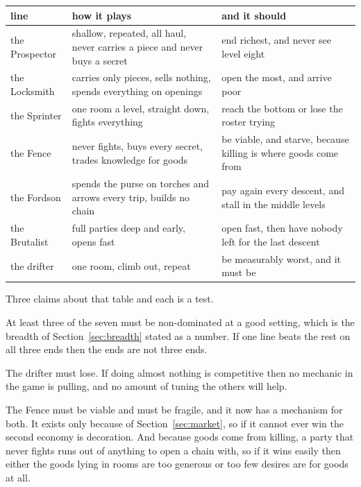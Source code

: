 \documentclass[11pt,a4paper]{article}
\begin{document}
\begin{center}
\begin{tabular}{@{}l@{\hspace{4mm}}>{\raggedright\arraybackslash}p{}@{\hspace{4mm}}>{\raggedright\arraybackslash}p{}@{}}
\toprule
\textbf{line} & \textbf{how it plays} & \textbf{and it should} \\
\midrule
the Prospector & shallow, repeated, all haul, never carries a piece and never buys a secret &
end richest, and never see level eight \\[1mm]
the Locksmith  & carries only pieces, sells nothing, spends everything on openings &
open the most, and arrive poor \\[1mm]
the Sprinter   & one room a level, straight down, fights everything &
reach the bottom or lose the roster trying \\[1mm]
the Fence      & never fights, buys every secret, trades knowledge for goods &
be viable, and starve, because killing is where goods come from \\[1mm]
the Fordson    & spends the purse on torches and arrows every trip, builds no chain &
pay again every descent, and stall in the middle levels \\[1mm]
the Brutalist  & full parties deep and early, opens fast &
open fast, then have nobody left for the last descent \\[1mm]
the drifter    & one room, climb out, repeat &
be measurably worst, and it must be \\
\bottomrule
\end{tabular}
\end{center}

Three claims about that table and each is a test.

At least three of the seven must be non-dominated at a good setting, which is the breadth of
Section~\ref{sec:breadth} stated as a number. If one line beats the rest on all three ends then the
ends are not three ends.

The drifter must lose. If doing almost nothing is competitive then no mechanic in the game is
pulling, and no amount of tuning the others will help.

The Fence must be viable and must be fragile, and it now has a mechanism for both. It exists only
because of Section~\ref{sec:market}, so if it cannot ever win the second economy is decoration. And
because goods come from killing, a party that never fights runs out of anything to open a chain
with, so if it wins easily then either the goods lying in rooms are too generous or too few desires
are for goods at all.
\end{document}

